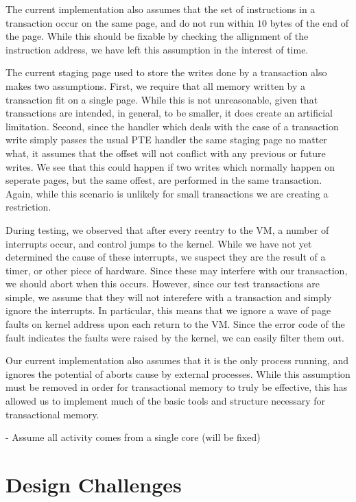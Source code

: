 \documentclass{acm_proc_article-sp}
\begin{document}
The current implementation also assumes that the set of instructions in a 
transaction occur on the same page, and do not run within $10$ bytes of the
end of the page. While this should be fixable by checking the allignment of
the instruction address, we have left this assumption in the interest of 
time. 

The current staging page used to store the writes done by a transaction also
makes two assumptions. First, we require that all memory written by a 
transaction fit on a single page. While this is not unreasonable, given that
transactions are intended, in general, to be smaller, it does create an
artificial limitation. Second, since the handler which deals with the case
of a transaction write simply passes the usual PTE handler the same staging
page no matter what, it assumes that the offset will not conflict with any
previous or future writes. We see that this could happen if two writes which
normally happen on seperate pages, but the same offest, are performed in the
same transaction. Again, while this scenario is unlikely for small transactions
we are creating a restriction.
 
During testing, we observed that after every reentry to the VM, a number
of interrupts occur, and control jumps to the kernel. While we have not yet
determined the cause of these interrupts, we suspect they are the result of 
a timer, or other piece of hardware. Since these may interfere with our 
transaction, we should abort when this occurs. However, since our test 
transactions are simple, we assume that they will not interefere with a 
transaction and simply ignore the interrupts. In particular, this means that
we ignore a wave of page faults on kernel address upon each return to the
VM. Since the error code of the fault indicates the faults were raised by
the kernel, we can easily filter them out.   

Our current implementation also assumes that it is the only process running,
and ignores the potential of aborts cause by external processes. While this
assumption must be removed in order for transactional memory to truly be
effective, this has allowed us to implement much of the basic tools and
structure necessary for transactional memory.
 
- Assume all activity comes from a single core (will be fixed)

\section{Design Challenges}
\end{document}
